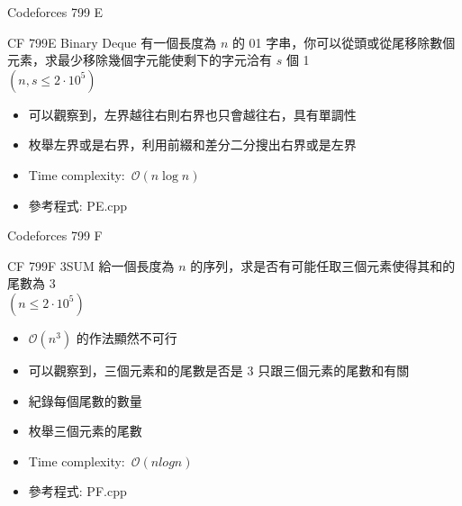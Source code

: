 \documentclass[aspectratio=169]{beamer}
\begin{document}
    \begin{frame}{Codeforces 799 E}
    	\begin{block}{CF 799E Binary Deque}
    		有一個長度為 $n$ 的 01 字串，你可以從頭或從尾移除數個元素，求最少移除幾個字元能使剩下的字元洽有 $s$ 個 1\\
    		$(n, s \le 2 \cdot 10^5)$
    	\end{block}
    	
		\begin{itemize}
			\item 可以觀察到，左界越往右則右界也只會越往右，具有單調性
			\item 枚舉左界或是右界，利用前綴和差分二分搜出右界或是左界
			\item Time complexity:\ $\mathcal{O}(n\log n)$
			\item 參考程式: PE.cpp
		\end{itemize}		    	
    \end{frame}
    
    \begin{frame}{Codeforces 799 F}
		\begin{block}{CF 799F 3SUM}
			給一個長度為 $n$ 的序列，求是否有可能任取三個元素使得其和的尾數為 $3$\\
			$(n \le 2 \cdot 10^5)$
		\end{block}		    
    
    		\begin{itemize}
    			\item $\mathcal{O}(n^3)$ 的作法顯然不可行
    			\item 可以觀察到，三個元素和的尾數是否是 $3$ 只跟三個元素的尾數和有關
    			\item 紀錄每個尾數的數量
    			\item 枚舉三個元素的尾數
    			\item Time complexity:\ $\mathcal{O}(nlogn)$
    			\item 參考程式: PF.cpp
    		\end{itemize}
    \end{frame}
    
\end{document}
